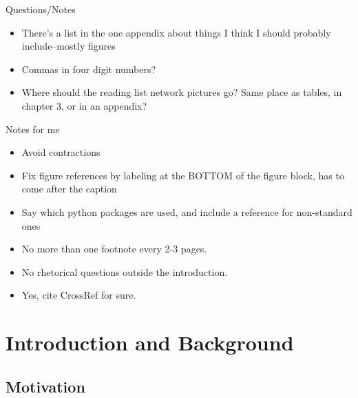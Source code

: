 \documentclass[12pt]{thesis}
\theoremstyle{plain}
\theoremstyle{definition}
\theoremstyle{remark}
\begin{document}
Questions/Notes
\begin{itemize}
\item There's a list in the one appendix about things I think I should probably include--mostly figures
\item Commas in four digit numbers?
\item Where should the reading list network pictures go? Same place as tables, in chapter 3, or in an appendix?
\end{itemize}
Notes for me
\begin{itemize}
\item Avoid contractions
\item Fix figure references by labeling at the BOTTOM of the figure block, has to come after the caption
\item Say which python packages are used, and include a reference for non-standard ones
\item No more than one footnote every 2-3 pages.
\item No rhetorical questions outside the introduction.
\item Yes, cite CrossRef for sure.
\end{itemize}
\pagebreak
















\chapter{Introduction and Background}




\section{Motivation}
\end{document}
